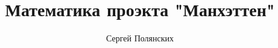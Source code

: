 \documentclass[12pt,oneside]{book}
\title{Математика проэкта "Манхэттен"}
\author{Сергей Полянских}
\date{}
\begin{document}
\maketitle{}

\tableofcontents{}





\end{document}
